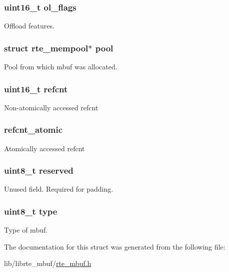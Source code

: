 \subsubsection[{ol\+\_\+flags}]{\setlength{\rightskip}{0pt plus 5cm}uint16\+\_\+t ol\+\_\+flags}\label{structrte__mbuf_ad00f52c8ce94438b6190a0e501a79fab}
Offload features. \hypertarget{structrte__mbuf_aa501505ef15ed551bf0a2ffacfc29bb5}{}
\subsubsection[{pool}]{\setlength{\rightskip}{0pt plus 5cm}struct {\bf rte\+\_\+mempool}$\ast$ pool}\label{structrte__mbuf_aa501505ef15ed551bf0a2ffacfc29bb5}
Pool from which mbuf was allocated. \hypertarget{structrte__mbuf_aeabb0685e90361917a58870b588e2e6f}{}
\subsubsection[{refcnt}]{\setlength{\rightskip}{0pt plus 5cm}uint16\+\_\+t refcnt}\label{structrte__mbuf_aeabb0685e90361917a58870b588e2e6f}
Non-\/atomically accessed refcnt \hypertarget{structrte__mbuf_a70ad642791f0943928abe0b6270d095c}{}
\subsubsection[{refcnt\+\_\+atomic}]{ refcnt\+\_\+atomic}\label{structrte__mbuf_a70ad642791f0943928abe0b6270d095c}
Atomically accessed refcnt \hypertarget{structrte__mbuf_acb7bc06bed6f6408d719334fc41698c7}{}
\subsubsection[{reserved}]{\setlength{\rightskip}{0pt plus 5cm}uint8\+\_\+t reserved}\label{structrte__mbuf_acb7bc06bed6f6408d719334fc41698c7}
Unused field. Required for padding. \hypertarget{structrte__mbuf_a1d127017fb298b889f4ba24752d08b8e}{}
\subsubsection[{type}]{\setlength{\rightskip}{0pt plus 5cm}uint8\+\_\+t type}\label{structrte__mbuf_a1d127017fb298b889f4ba24752d08b8e}
Type of mbuf. 

The documentation for this struct was generated from the following file\+:\begin{DoxyCompactItemize}
\item 
lib/librte\+\_\+mbuf/\hyperlink{rte__mbuf_8h}{rte\+\_\+mbuf.\+h}\end{DoxyCompactItemize}
